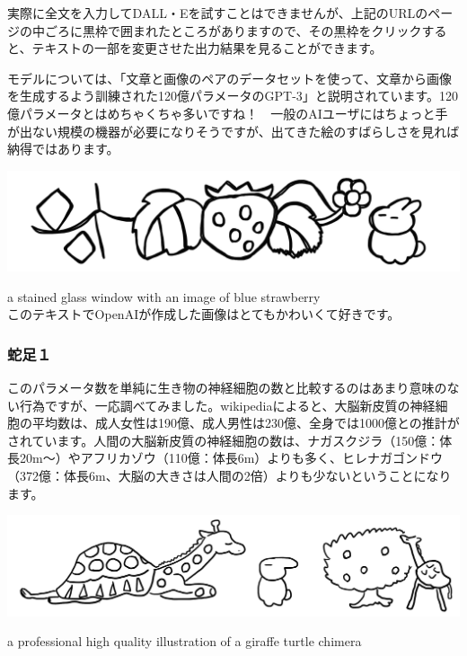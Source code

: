 \documentclass[dvipdfmx,autodetect-engine,10pt,b5paper,papersize,openany,dvipsnames]{jsbook}
\begin{document}
\begin{multicols}{2}
実際に全文を入力してDALL・Eを試すことはできませんが、上記のURLのページの中ごろに黒枠で囲まれたところがありますので、その黒枠をクリックすると、テキストの一部を変更させた出力結果を見ることができます。

モデルについては、「文章と画像のペアのデータセットを使って、文章から画像を生成するよう訓練された120億パラメータのGPT-3」と説明されています。120億パラメータとはめちゃくちゃ多いですね！　一般のAIユーザにはちょっと手が出ない規模の機器が必要になりそうですが、出てきた絵のすばらしさを見れば納得ではあります。
\end{multicols}


\includegraphics[width=\textwidth]{images/202101/newsletter20210218.png}
\begin{center}
a stained glass window with an image of blue strawberry\\
このテキストでOpenAIが作成した画像はとてもかわいくて好きです。
\end{center}


\begin{multicols}{2}
\subsubsection*{蛇足１}
このパラメータ数を単純に生き物の神経細胞の数と比較するのはあまり意味のない行為ですが、一応調べてみました。wikipediaによると、大脳新皮質の神経細胞の平均数は、成人女性は190億、成人男性は230億、全身では1000億との推計がされています。人間の大脳新皮質の神経細胞の数は、ナガスクジラ（150億：体長20m～）やアフリカゾウ（110億：体長6m）よりも多く、ヒレナガゴンドウ（372億：体長6m、大脳の大きさは人間の2倍）よりも少ないということになります。
\end{multicols}


\includegraphics[width=\textwidth]{images/202101/newsletter20210218_1.png}
\begin{center}
  a professional high quality illustration of a giraffe turtle chimera
\end{center}
\end{document}
